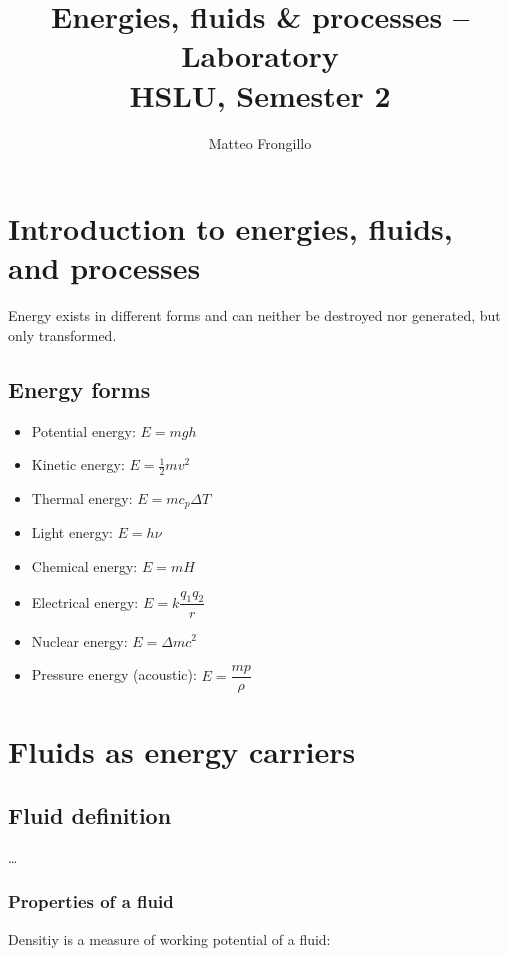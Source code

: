 \documentclass{article}
\title{\textbf{Energies, fluids \& processes -- Laboratory \\ HSLU, Semester 2}}
\author{Matteo Frongillo}
\date{}
\begin{document}
\maketitle
\tableofcontents
\pagebreak

\section{Introduction to energies, fluids, and processes}
Energy exists in different forms and can neither be destroyed nor generated, but only
transformed.

\subsection{Energy forms}
\begin{minipage}{.45\textwidth}
    \begin{itemize}[itemsep=6pt]
        \item Potential energy: $E = mgh$
        \item Kinetic energy: $E = \frac{1}{2}mv^2$
        \item Thermal energy: $E = mc_p\Delta T$
        \item Light energy: $E = h\nu$
    \end{itemize}
\end{minipage}
\hfill
\begin{minipage}{.45\textwidth}
    \begin{itemize}[itemsep=6pt]
        \item Chemical energy: $E = mH$
        \item Electrical energy: $E = k\dfrac{q_1 q_2}{r}$
        \item Nuclear energy: $E = \Delta mc^2$
        \item Pressure energy (acoustic): $E = \dfrac{m p}{\rho}$
    \end{itemize}
\end{minipage}

\section{Fluids as energy carriers}
\subsection{Fluid definition}
\dots

\subsubsection{Properties of a fluid}
Densitiy is a measure of working potential of a fluid:
\end{document}
